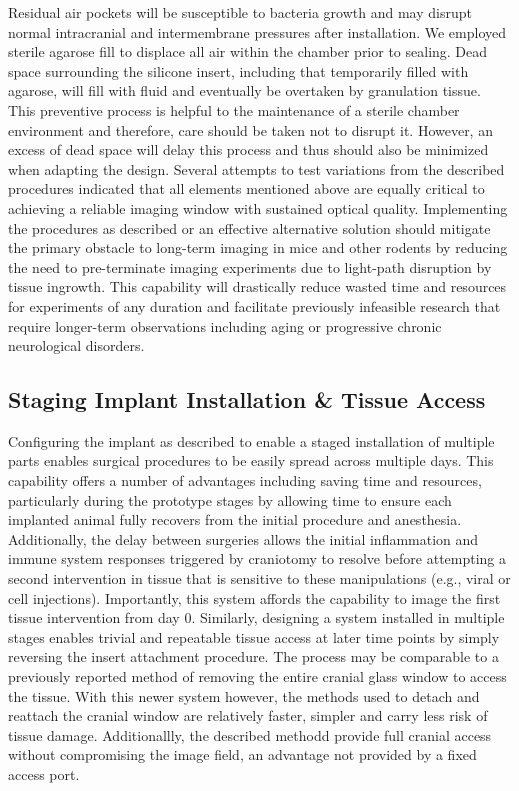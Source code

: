 Residual air pockets will be susceptible to bacteria growth and may disrupt normal intracranial and intermembrane pressures after installation.
We employed sterile agarose fill to displace all air within the chamber prior to sealing.
Dead space surrounding the silicone insert, including that temporarily filled with agarose, will fill with fluid and eventually be overtaken by granulation tissue.
This preventive process is helpful to the maintenance of a sterile chamber environment and therefore, care should be taken not to disrupt it.
However, an excess of dead space will delay this process and thus should also be minimized when adapting the design.
Several attempts to test variations from the described procedures indicated that all elements mentioned above are equally critical to achieving a reliable imaging window with sustained optical quality.
Implementing the procedures as described or an effective alternative solution should mitigate the primary obstacle to long-term imaging in mice and other rodents by reducing the need to pre-terminate imaging experiments due to light-path disruption by tissue ingrowth.
This capability will drastically reduce wasted time and resources for experiments of any duration and facilitate previously infeasible research that require longer-term observations including aging or progressive chronic neurological disorders.

\subsection{Staging Implant Installation \& Tissue Access}
\label{sec:staging-implant-installation-tissue-access}

Configuring the implant as described to enable a staged installation of multiple parts enables surgical procedures to be easily spread across multiple days.
This capability offers a number of advantages including saving time and resources, particularly during the prototype stages by allowing time to ensure each implanted animal fully recovers from the initial procedure and anesthesia.
Additionally, the delay between surgeries allows the initial inflammation and immune system responses triggered by craniotomy to resolve before attempting a second intervention in tissue that is sensitive to these manipulations (e.g., viral or cell injections).
Importantly, this system affords the capability to image the first tissue intervention from day 0.
Similarly, designing a system installed in multiple stages enables trivial and repeatable tissue access at later time points by simply reversing the insert attachment procedure.
The process may be comparable to a previously reported method of removing the entire cranial glass window to access the tissue.
With this newer system however, the methods used to detach and reattach the cranial window are relatively faster, simpler and carry less risk of tissue damage.
Additionallly, the described methodd provide full cranial access without compromising the image field, an advantage not provided by a fixed access port.

